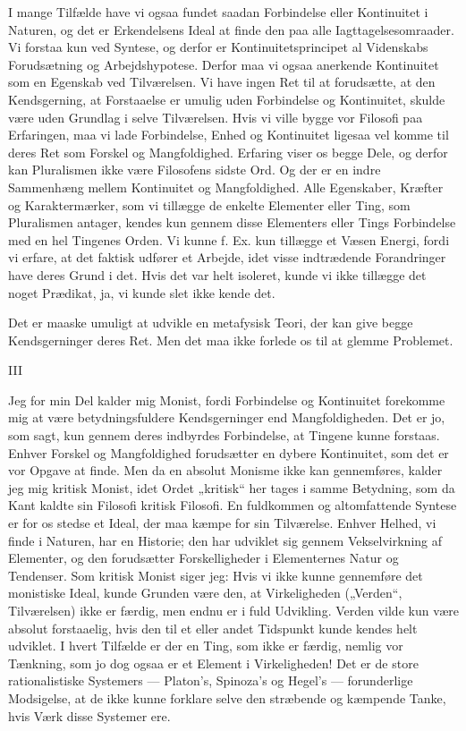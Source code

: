 \documentclass[12pt,a4paper,openany]{book}
\newcommand{\opage}[1]{\marginnote{\footnotesize\textit{[#1]}}}
\begin{document}
I mange Tilfælde have vi ogsaa fundet saadan Forbindelse
eller Kontinuitet i Naturen, og det er Erkendelsens Ideal at
finde den paa alle Iagttagelsesomraader. Vi forstaa kun ved
Syntese, og derfor er Kontinuitetsprincipet al Videnskabs Forudsætning
og Arbejdshypotese. Derfor maa vi ogsaa anerkende
Kontinuitet som en Egenskab ved Tilværelsen. Vi have ingen
Ret til at forudsætte, at den Kendsgerning, at Forstaaelse er
umulig uden Forbindelse og Kontinuitet, skulde være uden
Grundlag i selve Tilværelsen. Hvis vi ville bygge vor Filosofi
paa Erfaringen, maa vi lade Forbindelse, Enhed og Kontinuitet
ligesaa vel komme til deres Ret som Forskel og Mangfoldighed.
Erfaring viser os begge Dele, og derfor kan Pluralismen ikke
være Filosofens sidste Ord. Og der er en indre Sammenhæng
mellem Kontinuitet og Mangfoldighed. Alle Egenskaber, Kræfter
og Karaktermærker, som vi tillægge de enkelte Elementer eller
Ting, som Pluralismen antager, kendes kun gennem disse Elementers
eller Tings Forbindelse med en hel Tingenes Orden.
Vi kunne f. Ex. kun tillægge et Væsen Energi, fordi vi erfare,
\setcounter{footnote}{0}%
\opage{21}at det faktisk udfører et Arbejde, idet visse indtrædende Forandringer
have deres Grund i det. Hvis det var helt isoleret,
kunde vi ikke tillægge det noget Prædikat, ja, vi kunde slet
ikke kende det.

Det er maaske umuligt at udvikle en metafysisk Teori, der
kan give begge Kendsgerninger deres Ret. Men det maa ikke
forlede os til at glemme Problemet.

\begin{center}III\end{center}


Jeg for min Del kalder mig Monist, fordi Forbindelse og
Kontinuitet forekomme mig at være betydningsfuldere Kendsgerninger
end Mangfoldigheden. Det er jo, som sagt, kun gennem
deres indbyrdes Forbindelse, at Tingene kunne forstaas.
Enhver Forskel og Mangfoldighed forudsætter en dybere Kontinuitet,
som det er vor Opgave at finde. Men da en absolut
Monisme ikke kan gennemføres, kalder jeg mig kritisk Monist,
idet Ordet „kritisk“ her tages i samme Betydning, som da Kant
kaldte sin Filosofi kritisk Filosofi. En fuldkommen og altomfattende
Syntese er for os stedse et Ideal, der maa kæmpe for sin
Tilværelse. Enhver Helhed, vi finde i Naturen, har en Historie;
den har udviklet sig gennem Vekselvirkning af Elementer, og
den forudsætter Forskelligheder i Elementernes Natur og Tendenser.
Som kritisk Monist siger jeg: Hvis vi ikke kunne gennemføre
det monistiske Ideal, kunde Grunden være den, at Virkeligheden
(„Verden“, Tilværelsen) ikke er færdig, men endnu er i
fuld Udvikling. Verden vilde kun være absolut forstaaelig, hvis
den til et eller andet Tidspunkt kunde kendes helt udviklet. I
hvert Tilfælde er der en Ting, som ikke er færdig, nemlig vor
Tænkning, som jo dog ogsaa er et Element i Virkeligheden!
Det er de store rationalistiske Systemers --- Platon’s, Spinoza’s
og Hegel’s --- forunderlige Modsigelse, at de ikke kunne forklare
selve den stræbende og kæmpende Tanke, hvis Værk disse
Systemer ere.
\end{document}
